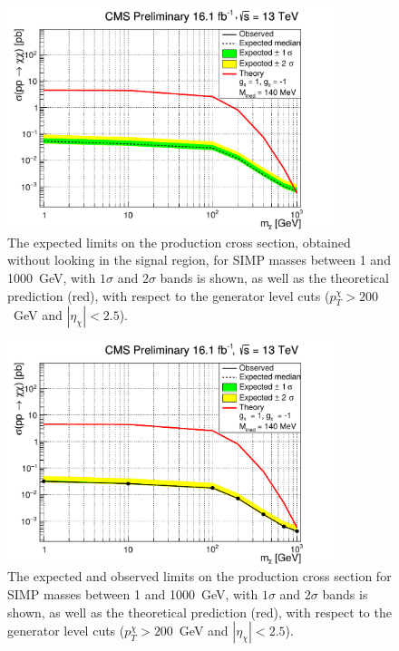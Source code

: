 \begin{figure}[ht]
  \centering
  \includegraphics[width=0.85\textwidth]{figures/ExclusionLimitGH_xsecVsM_ChF0p05_1leg_HybridNew_gmN_neutrons.pdf}\hfill%
  \caption{The expected limits on the production cross section, obtained without looking in the signal region, for \ac{SIMP} masses between 1 and 1000~GeV, with $1\sigma$ and $2\sigma$ bands is shown, as well as the theoretical prediction (red), with respect to the generator level cuts ($p_T^{\chi} > 200$~GeV and $|\eta_{\chi}| < 2.5$).}
  \label{fig:SIMP_limit}
\end{figure}

\begin{figure}[ht]
  \centering
  \includegraphics[width=0.85\textwidth]{figures/ExclusionLimitGH_xsecVsM_ChF0p05_1leg_HybridNew_gmN_neutrons_unblinded.pdf}\hfill%
  \caption{The expected and observed limits on the production cross section for \ac{SIMP} masses between 1 and 1000~GeV, with $1\sigma$ and $2\sigma$ bands is shown, as well as the theoretical prediction (red), with respect to the generator level cuts ($p_T^{\chi} > 200$~GeV and $|\eta_{\chi}| < 2.5$).}
  \label{fig:SIMP_limit_unblinded}
\end{figure}

\clearpage


\clearpage{\pagestyle{empty}\cleardoublepage}
